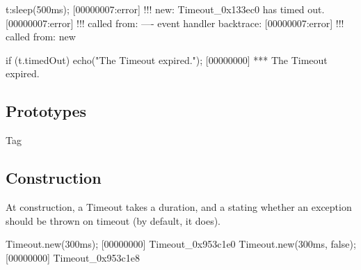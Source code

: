 \begin{urbiscript}
t:sleep(500ms);
[00000007:error] !!! new: Timeout_0x133ec0 has timed out.
[00000007:error] !!!    called from: ---- event handler backtrace:
[00000007:error] !!!    called from: new

if (t.timedOut)
  echo("The Timeout expired.");
[00000000] *** The Timeout expired.
\end{urbiscript}

\subsection{Prototypes}
\begin{refObjects}
\item[Tag]
\end{refObjects}

\subsection{Construction}
At construction, a Timeout takes a duration, and a 
stating whether an exception should be thrown on timeout (by default,
it does).

\begin{urbiscript}
Timeout.new(300ms);
[00000000] Timeout_0x953c1e0
Timeout.new(300ms, false);
[00000000] Timeout_0x953c1e8
\end{urbiscript}

